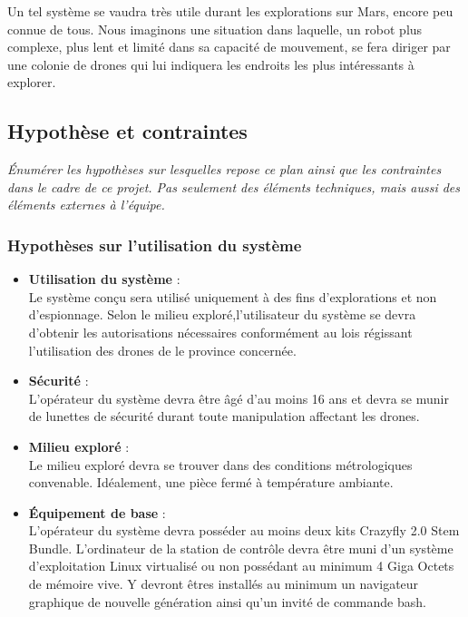 \documentclass{mistcoursedoc}
\begin{document}
\par Un tel système se vaudra très utile durant les explorations sur Mars, encore peu connue de tous.
Nous imaginons une situation dans laquelle, un robot plus complexe,
plus lent et limité dans sa capacité de mouvement, se fera diriger par une colonie de drones qui
lui indiquera les endroits les plus intéressants à explorer.

\subsection{Hypothèse et contraintes}

\textit{Énumérer les hypothèses sur lesquelles repose ce plan ainsi que les contraintes dans le cadre de ce projet.
Pas seulement des éléments techniques, mais aussi des éléments externes à l’équipe.}

\subsubsection{Hypothèses sur l'utilisation du système}

\begin{itemize}

  \item \textbf{Utilisation du système} :\\
  Le système conçu sera utilisé uniquement à des fins d'explorations et non d'espionnage. 
  Selon le milieu exploré,l'utilisateur du système se devra d'obtenir les autorisations nécessaires conformément au lois régissant l'utilisation
  des drones de le province concernée.

  \item \textbf{Sécurité} :\\
  L'opérateur du système devra être âgé d'au moins 16 ans et devra se munir de lunettes de sécurité durant toute
  manipulation affectant les drones.

  \item \textbf{Milieu exploré} :\\
  Le milieu exploré devra se trouver dans des conditions métrologiques convenable. 
  Idéalement, une pièce fermé à température ambiante.

  \item \textbf{Équipement de base} :\\
  L'opérateur du système devra posséder au moins deux kits Crazyfly 2.0 Stem Bundle.
  L'ordinateur de la station de contrôle devra être muni d'un système d'exploitation 
  Linux virtualisé ou non possédant au minimum 4 Giga Octets de mémoire vive. Y devront êtres installés 
  au minimum un navigateur graphique de nouvelle génération ainsi qu'un invité de commande bash.\\
  
\end{itemize}
\end{document}
